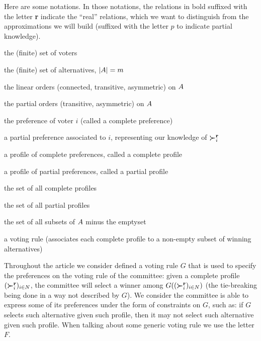 \documentclass[version=last, pagesize, twoside=off, bibliography=totoc, DIV=calc, fontsize=14pt, a4paper, french, english]{scrartcl}
\begin{document}
Here are some notations. In those notations, the relations in bold suffixed with the letter \textbf{r} indicate the “real” relations, which we want to distinguish from the approximations we will build (suffixed with the letter $p$ to indicate partial knowledge).
\begin{description}[font=\normalfont, leftmargin=!, labelwidth=\widthof{$F: \allprofs \rightarrow \powersetz{\alts}$}]
	\item[$N ≠ \emptyset$] the (finite) set of voters
	\item[$\alts$] the (finite) set of alternatives, $\lvert{A}\rvert = m$
	\item[$\linors \subseteq \powerset{\alts × \alts}$] the linear orders (connected, transitive, asymmetric) on $\alts$
	\item[$\pors \subseteq \powerset{\alts × \alts}$] the partial orders (transitive, asymmetric) on $\alts$
	\item[$\pref_i \in \linors$] the preference of voter $i$ (called a complete preference)
	\item[$\ppref_i \in \pors$] a partial preference associated to $i$, representing our knowledge of $\boldsymbol{\succ}^\textbf{r}_i$
	\item[$\prof = \profshort$] a profile of complete preferences, called a complete profile
	\item[$\pprof = \pprofshort$] a profile of partial preferences, called a partial profile
	\item[$\allprofs$] the set of all complete profiles
	\item[$\allpprofs$] the set of all partial profiles
	\item[$\powersetz{\alts}$] the set of all subsets of $\alts$ minus the emptyset
	\item[$F: \allprofs \rightarrow \powersetz{\alts}$] a voting rule (associates each complete profile to a non-empty subset of winning alternatives)
\end{description}

Throughout the article we consider defined a voting rule $G$ that is used to specify the preferences on the voting rule of the committee: given a complete profile $(\boldsymbol{\succ}^\textbf{r}_i)_{i \in N}$, the committee will select a winner among $G((\boldsymbol{\succ}^\textbf{r}_i)_{i \in N})$ (the tie-breaking being done in a way not described by $G$). We consider the committee is able to express some of its preferences under the form of constraints on $G$, such as: if $G$ selects such alternative given such profile, then it may not select such alternative given such profile.
When talking about some generic voting rule we use the letter $F$. 
\end{document}
